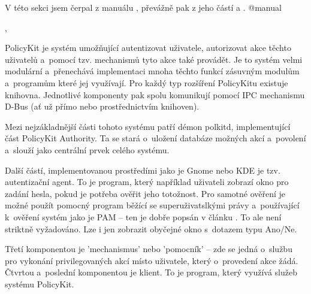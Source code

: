 V této sekci jsem čerpal z manuálu \cite{manpolkit_overview}, převážně pak z jeho částí \cite{manpolkit1} a \cite{manpklocalauth}. @manual{,

PolicyKit je systém umožňující autentizovat uživatele, autorizovat akce těchto uživatelů a~pomocí tzv. mechanismů tyto akce také provádět. Je to systém velmi modulární a~přenechává implementaci mnoha těchto funkcí zásuvným modulům a~programům které jej využívají. Pro každý typ rozšíření PolicyKitu existuje knihovna. Jednotlivé komponenty pak spolu komunikují pomocí IPC mechanismu D-Bus (ať už přímo nebo prostřednictvím knihoven).

Mezi nejzákladnější části tohoto systému patří démon polkitd, implementující část PolicyKit Authority. Ta se stará o~uložení databáze možných akcí a~povolení a~slouží jako centrální prvek celého systému.

Další částí, implementovanou prostředími jako je Gnome nebo KDE je tzv. autentizační agent. To je program, který například uživateli zobrazí okno pro zadání hesla, pokud je potřeba ověřit jeho totožnost. Pro samotné ověření je možné použít pomocný program běžící se superuživatslkými právy a~používající k~ověření systém jako je PAM -- ten je dobře popsán v článku \cite{rootpam}. To ale není striktně vyžadováno. Lze i jen zobrazit obyčejné okno s~dotazem typu Ano/Ne.

Třetí komponentou je 'mechanismus' nebo 'pomocník' -- zde se jedná o~službu pro vykonání privilegovaných akcí místo uživatele, který o~provedení akce žádá. Čtvrtou a~poslední komponentou je klient. To je program, který využívá služeb systému PolicyKit.


}
